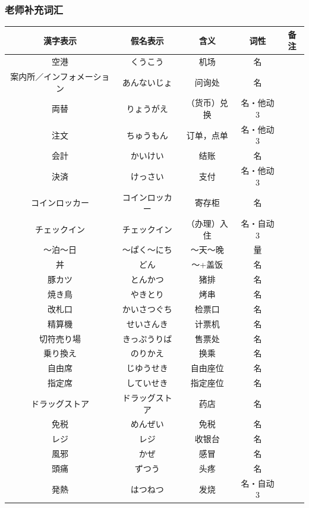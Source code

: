 \subsubsection{老师补充词汇}
\begin{longtable}{|c|c|c|c|c|}
    \hline

漢字表示 & 假名表示  & 含义 & 词性 & 备注 \\ \hline\hline  
    空港 & くうこう & 机场 & 名 & \\ \hline
    案内所／インフォメーション & あんないじょ & 问询处 & 名 & \\ \hline
    両替 & りょうがえ & （货币）兑换 & 名・他动3 & \\ \hline
    注文 & ちゅうもん & 订单，点单 & 名・他动3 & \\ \hline
    会計 & かいけい & 结账 & 名 & \\ \hline
    決済 & けっさい & 支付 & 名・他动3 & \\ \hline
    コインロッカー & コインロッカー & 寄存柜 & 名 & \\ \hline
    チェックイン & チェックイン & （办理）入住 & 名・自动3 & \\ \hline
    〜泊〜日 & 〜ぱく〜にち & ～天～晚 & 量 & \\ \hline
    丼 & どん & ～+盖饭 & 名 & \\ \hline
    豚カツ & とんかつ & 猪排 & 名 & \\ \hline
    焼き鳥 & やきとり & 烤串 & 名 & \\ \hline
    改札口 & かいさつぐち & 检票口 & 名 & \\ \hline
    精算機 & せいさんき & 计票机 & 名 & \\ \hline
    切符売り場 & きっぷうりば & 售票处 & 名 & \\ \hline
    乗り換え & のりかえ & 换乘 & 名 & \\ \hline
    自由席 & じゆうせき & 自由座位 & 名 & \\ \hline
    指定席 & していせき & 指定座位 & 名 & \\ \hline
    ドラッグストア & ドラッグストア & 药店 & 名 & \\ \hline
    免税 & めんぜい & 免税 & 名 & \\ \hline
    レジ & レジ & 收银台 & 名 & \\ \hline
    風邪 & かぜ & 感冒 & 名 & \\ \hline
    頭痛 & ずつう & 头疼 & 名 & \\ \hline
    発熱 & はつねつ & 发烧 & 名・自动3 & \\ \hline

\end{longtable}

